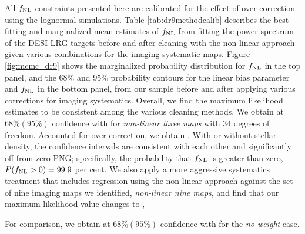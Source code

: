 All $f_{\rm NL}$ constraints presented here are calibrated for the effect of over-correction using the lognormal simulations. Table \ref{tab:dr9methodcalib} describes the best-fitting and marginalized mean estimates of $f_{\rm NL}$ from fitting the power spectrum of the DESI LRG targets before and after cleaning with the non-linear approach given various combinations for the imaging systematic maps. Figure \ref{fig:mcmc_dr9} shows the marginalized probability distribution for $f_{\rm NL}$ in the top panel, and the $68\%$ and $95\%$ probability contours for the linear bias parameter and $f_{\rm NL}$ in the bottom panel, from our sample before and after applying various corrections for imaging systematics. Overall, we find the maximum likelihood estimates to be consistent among the various cleaning methods. We obtain  at $68\%(95\%)$ confidence with  for \textit{non-linear three maps} with $34$ degrees of freedom. Accounted for over-correction, we obtain . With or without stellar density, the confidence intervals are consistent with each other and significantly off from zero PNG; specifically, the probability that $f_{\rm NL}$ is  greater than zero, $P(f_{\rm NL} >0)=99.9$ per cent. We also apply a more aggressive systematics treatment that includes regression using the non-linear approach against the set of nine imaging maps we identified, \textit{non-linear nine maps}, and find that  our maximum likelihood value changes  to ,  

 For comparison, we obtain  at $68\% (95\%)$ confidence with  for the \textit{no weight} case.

